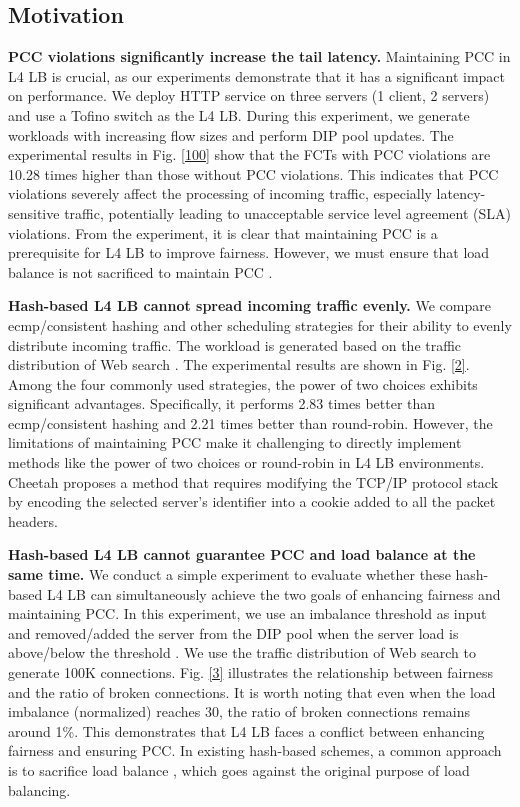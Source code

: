 \subsection{Motivation}
\textbf{PCC violations significantly increase the tail latency.} Maintaining PCC in L4 LB is crucial, as our experiments demonstrate that it has a significant impact on performance. We deploy HTTP service on three servers (1 client, 2 servers) and use a Tofino switch as the L4 LB. During this experiment, we generate workloads with increasing flow sizes and perform DIP pool updates. The experimental results in Fig. \ref{100} show that the FCTs with PCC violations are 10.28 times higher than those without PCC violations. This indicates that PCC violations severely affect the processing of incoming traffic, especially latency-sensitive traffic, potentially leading to unacceptable service level agreement (SLA) violations. From the experiment, it is clear that maintaining PCC is a prerequisite for L4 LB to improve fairness. However, we must ensure that load balance is not sacrificed to maintain PCC \cite{barbette2020high}.

\textbf{Hash-based L4 LB cannot spread incoming traffic evenly.} We compare ecmp/consistent hashing and other scheduling strategies for their ability to evenly distribute incoming traffic. The workload is generated based on the traffic distribution of Web search \cite{alizadeh2010data}. The experimental results are shown in Fig. \ref{2}. Among the four commonly used strategies, the power of two choices exhibits significant advantages. Specifically, it performs 2.83 times better than ecmp/consistent hashing and 2.21 times better than round-robin. However, the limitations of maintaining PCC make it challenging to directly implement methods like the power of two choices or round-robin in L4 LB environments. Cheetah proposes a method that requires modifying the TCP/IP protocol stack by encoding the selected server’s identifier into a cookie added to all the packet headers.

\textbf{Hash-based L4 LB cannot guarantee PCC and load balance at the same time.} We conduct a simple experiment to evaluate whether these hash-based L4 LB can simultaneously achieve the two goals of enhancing fairness and maintaining PCC. In this experiment, we use an imbalance threshold as input and removed/added the server from the DIP pool when the server load is above/below the threshold \cite{barbette2021cheetah}. We use the traffic distribution of Web search to generate 100K connections. Fig. \ref{3} illustrates the relationship between fairness and the ratio of broken connections. It is worth noting that even when the load imbalance (normalized) reaches 30, the ratio of broken connections remains around 1\%. This demonstrates that L4 LB faces a conflict between enhancing fairness and ensuring PCC. In existing hash-based schemes, a common approach is to sacrifice load balance \cite{eisenbud2016maglev, olteanu2018stateless}, which goes against the original purpose of load balancing.


